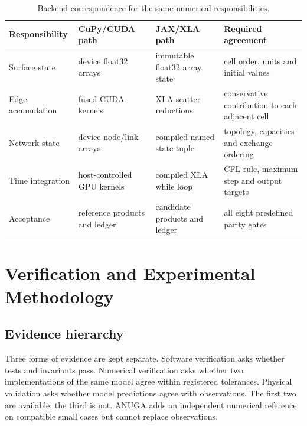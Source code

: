 \documentclass[11pt,a4paper,oneside]{report}
\begin{document}
\begin{table}[H]
\centering
\caption[Backend correspondence in the production calculation.]{Backend correspondence for
the same numerical responsibilities.}
\label{tab:backendmap}
\footnotesize
\begin{tabularx}{\textwidth}{|p{}|p{}|p{}|X|}
\hline
\textbf{Responsibility} & \textbf{CuPy/CUDA path} & \textbf{JAX/XLA path} &
\textbf{Required agreement} \\
\hline\hline
Surface state & device float32 arrays & immutable float32 array state & cell order, units and
initial values \\ \hdashline[0.4pt/1.2pt]
Edge accumulation & fused CUDA kernels & XLA scatter reductions & conservative contribution
to each adjacent cell \\ \hdashline[0.4pt/1.2pt]
Network state & device node/link arrays & compiled named state tuple & topology, capacities
and exchange ordering \\ \hdashline[0.4pt/1.2pt]
Time integration & host-controlled GPU kernels & compiled XLA while loop & CFL rule,
maximum step and output targets \\ \hdashline[0.4pt/1.2pt]
Acceptance & reference products and ledger & candidate products and ledger & all eight
predefined parity gates \\
\hline
\end{tabularx}
\end{table}

\chapter{Verification and Experimental Methodology}\label{chap:method}
\section{Evidence hierarchy}
Three forms of evidence are kept separate. Software verification asks whether tests and
invariants pass. Numerical verification asks whether two implementations of the same model
agree within registered tolerances. Physical validation asks whether model predictions agree
with observations. The first two are available; the third is not. ANUGA adds an independent
numerical reference on compatible small cases but cannot replace observations.
\end{document}
